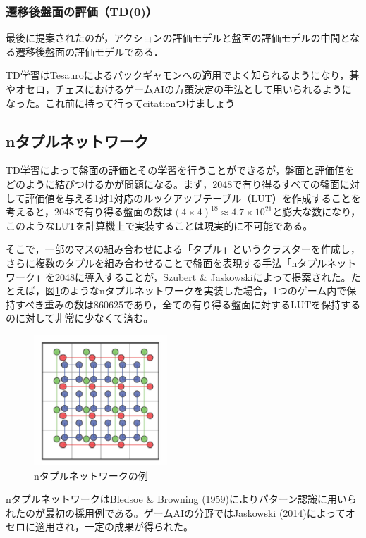 \documentclass{suribt}
\begin{document}
\subsubsection{遷移後盤面の評価（TD(0)）}
最後に提案されたのが，アクションの評価モデルと盤面の評価モデルの中間となる遷移後盤面の評価モデルである．






TD学習はTesauroによるバックギャモンへの適用でよく知られるようになり，碁やオセロ，チェスにおけるゲームAIの方策決定の手法として用いられるようになった。これ前に持って行ってcitationつけましょう

\subsection{nタプルネットワーク}
TD学習によって盤面の評価とその学習を行うことができるが，盤面と評価値をどのように結びつけるかが問題になる。まず，2048で有り得るすべての盤面に対して評価値を与える1対1対応のルックアップテーブル（LUT）を作成することを考えると，2048で有り得る盤面の数は$(4 \times 4)^{18} \approx 4.7 \times 10^{21}$と膨大な数になり，このようなLUTを計算機上で実装することは現実的に不可能である。

そこで，一部のマスの組み合わせによる「タプル」というクラスターを作成し，さらに複数のタプルを組み合わせることで盤面を表現する手法「nタプルネットワーク」を2048に導入することが，Szubert \& Jaskowskiによって提案された。たとえば，図\ref{figure_001}のようなnタプルネットワークを実装した場合，1つのゲーム内で保持すべき重みの数は860625であり，全ての有り得る盤面に対するLUTを保持するのに対して非常に少なくて済む。

\begin{figure}[t]
	\begin{center}
	\includegraphics[width=5cm]{figure_001.png}
	\caption{nタプルネットワークの例}
	\label{figure_001}
	\end{center}
\end{figure}

nタプルネットワークはBledsoe \& Browning (1959)によりパターン認識に用いられたのが最初の採用例である。ゲームAIの分野ではJaskowski (2014)によってオセロに適用され，一定の成果が得られた。
\end{document}
